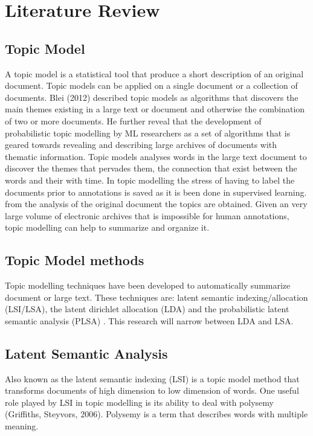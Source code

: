 \chapter{Literature Review}
\section{Topic Model}  
A topic model is a statistical tool that produce a short description of an original document. Topic models can be applied on a single document or a collection of documents. Blei (2012) described topic models as algorithms that discovers the main themes existing in a large text or document and otherwise the combination of two or more documents. He further reveal that the development of probabilistic topic modelling by ML  researchers as a set of algorithms that is geared towards revealing and describing large archives of documents with thematic information. Topic models analyses words in the large text document to discover the themes that pervades them, the connection that exist between the words and their with time. In topic modelling the stress of having to label the documents prior to annotations is saved as it is been done in supervised learning. from the analysis of the original document the topics are obtained. Given an very large volume of electronic archives that is impossible for human annotations, topic modelling can help to summarize and organize it.
\section{Topic Model methods}
Topic modelling techniques have been developed to automatically summarize document or large text. These techniques are: latent semantic indexing/allocation  (LSI/LSA), the latent dirichlet allocation (LDA) and the probabilistic latent semantic analysis (PLSA) . This research will narrow between LDA and LSA.
\section{Latent Semantic Analysis} 
Also known as the latent semantic indexing (LSI) is a topic model method
that transforms documents of high dimension to low dimension of words. One useful role played by LSI in topic modelling is its ability to deal with polysemy (Griffiths, Steyvors, 2006). Polysemy is a term that describes words with multiple meaning.
